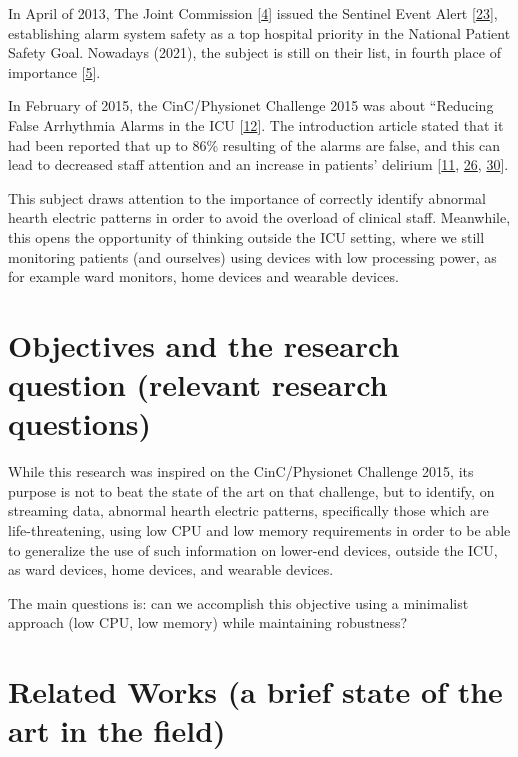 \documentclass[runningheads]{llncs}
\begin{document}
In April of 2013, The Joint Commission {[}\protect\hyperlink{ref-the_jc}{4}{]} issued the Sentinel Event Alert
{[}\protect\hyperlink{ref-JointCommission2013}{23}{]}, establishing alarm system safety as a top hospital priority in the National
Patient Safety Goal. Nowadays (2021), the subject is still on their list, in fourth place of
importance {[}\protect\hyperlink{ref-the_jc2021}{5}{]}.

In February of 2015, the CinC/Physionet Challenge 2015 was about ``Reducing False Arrhythmia Alarms
in the ICU {[}\protect\hyperlink{ref-Clifford2015}{12}{]}. The introduction article stated that it had been reported that up to 86\%
resulting of the alarms are false, and this can lead to decreased staff attention and an increase in
patients' delirium {[}\protect\hyperlink{ref-Chambrin2001}{11}, \protect\hyperlink{ref-Lawless1994}{26}, \protect\hyperlink{ref-Parthasarathy2004}{30}{]}.

This subject draws attention to the importance of correctly identify abnormal hearth electric patterns
in order to avoid the overload of clinical staff. Meanwhile, this opens the opportunity of thinking
outside the ICU setting, where we still monitoring patients (and ourselves) using devices with
low processing power, as for example ward monitors, home devices and wearable devices.

\hypertarget{objectives-and-the-research-question-relevant-research-questions}{%
\section{Objectives and the research question (relevant research questions)}\label{objectives-and-the-research-question-relevant-research-questions}}

While this research was inspired on the CinC/Physionet Challenge 2015, its purpose is not to beat
the state of the art on that challenge, but to identify, on streaming data, abnormal hearth electric
patterns, specifically those which are life-threatening, using low CPU and low memory requirements
in order to be able to generalize the use of such information on lower-end devices, outside the ICU,
as ward devices, home devices, and wearable devices.

The main questions is: can we accomplish this objective using a minimalist approach (low CPU, low
memory) while maintaining robustness?

\hypertarget{related-works-a-brief-state-of-the-art-in-the-field}{%
\section{Related Works (a brief state of the art in the field)}\label{related-works-a-brief-state-of-the-art-in-the-field}}
\end{document}
